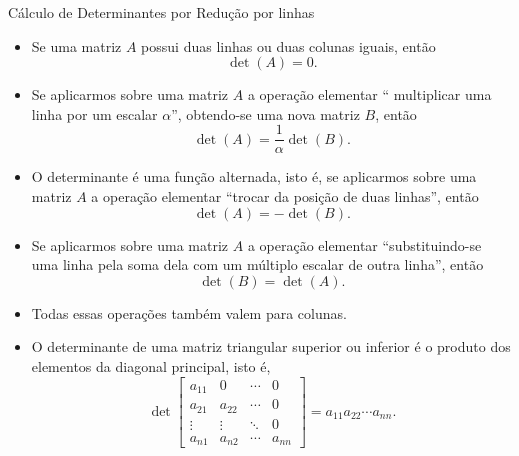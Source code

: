 %
%
%

\begin{frame}[label=determinantes]{Cálculo de Determinantes por Redução por linhas}

\begin{itemize}

\item Se uma matriz $A$ possui {\color{blue}duas linhas ou duas colunas iguais}, então 
\[\det(A)=0.\]

\item Se aplicarmos sobre uma  matriz $A$ a operação elementar 
``{\color{blue} multiplicar uma linha por um escalar $\alpha$}'', obtendo-se uma nova matriz \(B\), então
\[ \det(A)=\frac{1}{\alpha}\det(B).\]



\item O determinante é uma {\color{blue}função alternada}, isto é, se aplicarmos sobre uma  matriz $A$ a operação elementar  ``{\color{blue}trocar da posição de duas linhas}'', então 
\[\det(A)=-\det(B).\]

\item Se aplicarmos sobre uma  matriz $A$ a operação elementar   ``{\color{blue}substituindo-se uma linha pela soma dela com um múltiplo escalar de outra linha}'', então 
\[\det(B)=\det(A).\]

\end{itemize}

\end{frame}

\begin{frame}[label=determinantes]
\begin{itemize}

\item Todas essas operações também valem para colunas.

\item  O determinante de uma matriz triangular superior ou inferior é o produto dos elementos da diagonal principal, isto é,
\[
\det \begin{bmatrix}
a_{11} & 0 & \cdots & 0\\
a_{21} & a_{22} & \cdots & 0\\
\vdots & \vdots & \ddots & 0\\ 
a_{n1} & a_{n2} & \cdots & a_{nn}
\end{bmatrix}= a_{11}a_{22}\cdots a_{nn}.
\]
\end{itemize}

\end{frame}

